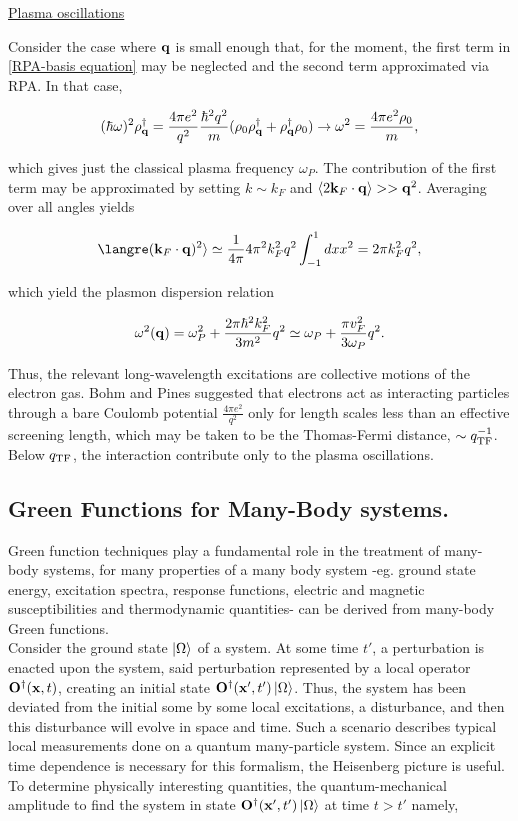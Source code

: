 \documentclass{homework}
\begin{document}
\underline{Plasma oscillations}

Consider the case where ${\bf q}$ is small enough that, for the moment, the first term in \cref{RPA-basis equation} may be neglected and the second term approximated via RPA. In that case, 

$$
(\hbar \omega)^2 \rho_{{\bf q}}^\dagger = \frac{4\pi e^2}{q^2} \frac{\hbar^2 q^2}{m} (\rho_0 \rho_{{\bf q}}^\dagger + \rho_{{\bf q}}^\dagger \rho_0 ) \rightarrow \omega^2 = \frac{4\pi e^2 \rho_0}{m},
$$

which gives just the classical plasma frequency $\omega_P$. The contribution of the first term may be approximated by setting $k \sim k_F$ and $\langle 2 {\bf k}_F \cdot {\bf q} \rangle >> {\bf q}^2$. Averaging over all angles yields

$$
\langre ({\bf k}_F \cdot {\bf q})^2 \rangle \simeq \frac{1}{4\pi} 4\pi^2 k_F^2 q^2 \int_{-1}^{1} dx x^2 = 2\pi k_F^2 q^2, 
$$

which yield the plasmon dispersion relation

$$
\omega^2({\bf q}) = \omega_P^2 + \frac{2\pi \hbar^2 k_F^2}{3m^2} q^2 \simeq \omega_P + \frac{\pi v_F^2}{3\omega_P} q^2. 
$$

Thus, the relevant long-wavelength excitations are collective motions of the electron gas. Bohm and Pines suggested that electrons act as interacting particles through a bare Coulomb potential $\frac{4\pi e^2}{q^2}$ only for length scales less than an effective screening length, which may be taken to be the Thomas-Fermi distance, $\sim q_{\textnormal{TF}}^{-1}$. Below $q_{\textnormal{TF}}$, the interaction contribute only to the plasma oscillations. \\

\subsection{Green Functions for Many-Body systems.}

Green function techniques play a fundamental role in the treatment of many-body systems, for many properties of a many body system -eg. ground state energy, excitation spectra, response functions, electric and magnetic susceptibilities and thermodynamic quantities- can be derived from many-body Green functions.\\

Consider the ground state $\ket{\Omega}$ of a system. At some time $t'$, a perturbation is enacted upon the system, said perturbation represented by a local operator ${\bf O}^\dagger({\bf x}, t)$, creating an initial state ${\bf O}^\dagger({\bf x}', t') \ket{\Omega}$. Thus, the system has been deviated from the initial some by some local excitations, a disturbance, and then this disturbance will evolve in space and time. Such a scenario describes typical local measurements done on a quantum many-particle system. Since an explicit time dependence is necessary for this formalism, the Heisenberg picture is useful. To determine physically interesting quantities, the quantum-mechanical amplitude to find the system in state ${\bf O}^\dagger({\bf x}', t') \ket{\Omega}$ at time $t > t'$ namely, 
\end{document}
